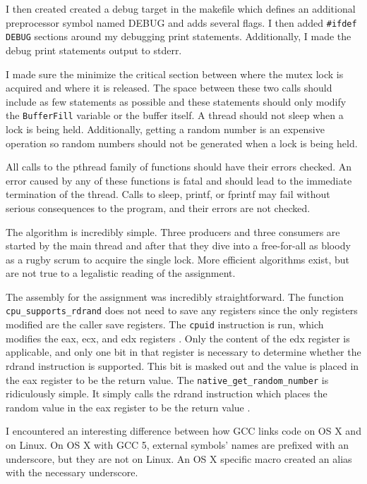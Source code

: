 \documentclass[10pt,conference,draftclsnofoot,onecolumn]{IEEEtran}
\begin{document}
I then created created a debug target in the makefile which defines an additional preprocessor symbol named DEBUG and adds several flags. I then added \texttt{\#ifdef DEBUG} sections around my debugging print statements. Additionally, I made the debug print statements output to stderr.

I made sure the minimize the critical section between where the mutex lock is acquired and where it is released. The space between these two calls should include as few statements as possible and these statements should only modify the \texttt{BufferFill} variable or the buffer itself. A thread should not sleep when a lock is being held. Additionally, getting a random number is an expensive operation so random numbers should not be generated when a lock is being held.

All calls to the pthread family of functions should have their errors checked. An error caused by any of these functions is fatal and should lead to the immediate termination of the thread. Calls to sleep, printf, or fprintf may fail without serious consequences to the program, and their errors are not checked.

The algorithm is incredibly simple. Three producers and three consumers are started by the main thread and after that they dive into a free-for-all as bloody as a rugby scrum to acquire the single lock. More efficient algorithms exist, but are not true to a legalistic reading of the assignment.

The assembly for the assignment was incredibly straightforward. The function \texttt{cpu\_supports\_rdrand} does not need to save any registers since the only registers modified are the caller save registers. The \texttt{cpuid} instruction is run, which modifies the eax, ecx, and edx registers \cite{2_intel}. Only the content of the edx register is applicable, and only one bit in that register is necessary to determine whether the rdrand instruction is supported. This bit is masked out and the value is placed in the eax register to be the return value. The \texttt{native\_get\_random\_number} is ridiculously simple. It simply calls the rdrand instruction which places the random value in the eax register to be the return value \cite{1_intel}.

I encountered an interesting difference between how GCC links code on OS X and on Linux. On OS X with GCC 5, external symbols' names are prefixed with an underscore, but they are not on Linux. An OS X specific macro created an alias with the necessary underscore.
\end{document}
